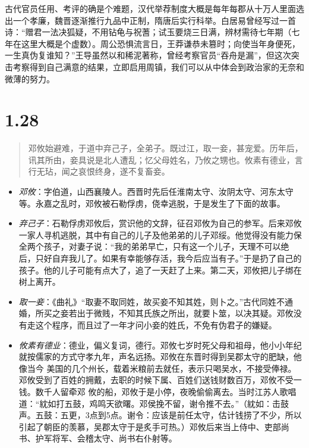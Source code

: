 \documentclass[]{book}
\providecommand{\tightlist}{%
  \setlength{\itemsep}{0pt}\setlength{\parskip}{0pt}}
\begin{document}
古代官员任用、考评的确是个难题，汉代举荐制度大概是每年每郡从十万人里面选出一个孝廉，魏晋逐渐推行九品中正制，隋唐后实行科举。白居易曾经写过一首诗：``赠君一法决狐疑，不用钻龟与祝蓍；试玉要烧三日满，辨材需待七年期（七年在这里大概是个虚数）。周公恐惧流言日，王莽谦恭未篡时；向使当年身便死，一生真伪复谁知？''王导虽然以和稀泥著称，曾经考察官员``吞舟是漏''，但这次突击考察得到自己满意的结果，立即启用周镇，我们可以从中体会到政治家的无奈和微薄的努力。

\section{1.28}\label{section-27}

\begin{quote}
邓攸始避难，于道中弃己子，全弟子。既过江，取一妾，甚宠爱。历年后，讯其所由，妾具说是北人遭乱；忆父母姓名，乃攸之甥也。攸素有德业，言行无玷，闻之哀恨终身，遂不复畜妾。
\end{quote}

\begin{itemize}
\tightlist
\item
  \emph{邓攸}：字伯道，山西襄陵人。西晋时先后任淮南太守、汝阴太守、河东太守等。永嘉之乱时，邓攸被石勒俘虏，侥幸逃脱，于是发生了下面的故事。
\item
  \emph{弃己子}：石勒俘虏邓攸后，赏识他的文辞，征召邓攸为自己的参军。后来邓攸一家人寻机逃脱，其中有自己的儿子及他弟弟的儿子邓绥。他觉得没有能力保全两个孩子，对妻子说：``我的弟弟早亡，只有这一个儿子，天理不可以绝后，只好自弃我儿了。如果有幸能够存活，我今后应当有子。''于是扔了自己的孩子。他的儿子可能有点大了，追了一天赶了上来。第二天，邓攸把儿子绑在树上离开。
\item
  \emph{取一妾}：《曲礼》``取妻不取同姓，故买妾不知其姓，则卜之。''古代同姓不通婚，所买之妾若出于微贱，不知其氏族之所出，就要卜筮，以决其疑。邓攸没有走这个程序，而且过了一年才问小妾的姓氏，不免有伪君子的嫌疑。
\item
  \emph{攸素有德业}：德业，偏义复词，德行。邓攸七岁时死父母和祖母，他小小年纪就按儒家的方式守孝九年，声名远扬。邓攸在东晋时得到吴郡太守的肥缺，他像当今
  美国的几个州长，载着米粮前去就任，表示只喝吴水，不接受俸禄。邓攸受到了百姓的拥戴，去职的时候下属、百姓们送钱财数百万，邓攸不受一钱。数千人留牵邓
  攸的船，邓攸于是小停，夜晚偷偷离去。当时江苏人歌唱道：``紞如打五鼓，鸡鸣天欲曙。邓侯挽不留，谢令推不去。''（紞如：击鼓声。五鼓：五更，3点到5点。谢令：应该是前任太守，估计钱捞了不少，所以引起了朝臣的羡慕，吴郡太守于是炙手可热。）邓攸后来当上侍中、吏部尚书、护军将军、会稽太守、尚书右仆射等。
\end{itemize}
\end{document}
